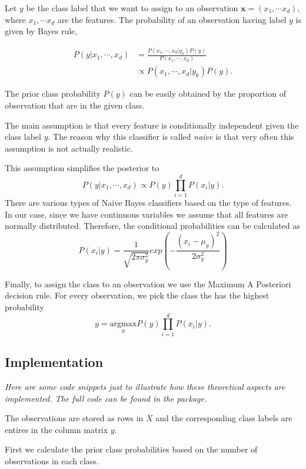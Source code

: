 \documentclass[]{article}
\begin{document}
Let \(y\) be the class label that we want to assign to an observation
\(\boldsymbol{x}=(x_1,\cdots x_d)\), where \(x_1,\cdots x_d\) are the
features. The probability of an observation having label \(y\) is given
by Bayes rule,

\begin{align*}
P(y|x_1,\cdots,x_d)&=\frac{P(x_1,\cdots,x_d|y_k)P(y)}{P(x_1,\cdots,x_d)}\\
&\propto P(x_1,\cdots,x_d|y_k)P(y).
\end{align*}

The prior class probability \(P(y)\) can be easily obtained by the
proportion of observation that are in the given class.

The main assumption is that every feature is conditionally independent
given the class label \(y\). The reason why this classifier is called
\emph{naive} is that very often this assumption is not actually
realistic.

This assumption simplifies the posterior to
\[P(y|x_1,\cdots,x_d) \propto P(y)\prod_{i=1}^d P(x_i|y).\] There are
various types of Naive Bayes classifiers based on the type of features.
In our case, since we have continuous variables we assume that all
features are normally distributed. Therefore, the conditional
probabilities can be calculated as
\[P(x_i|y)=\frac{1}{\sqrt{2\pi\sigma_y^2}}exp\left(-\frac{(x_i-\mu_y)^2}{2\sigma_y^2}\right)\]

Finally, to assign the class to an observation we use the Maximum A
Posteriori decision rule. For every observation, we pick the class the
has the highest probability
\[y=\underset{y}{\text{argmax}}P(y)\prod_{i=1}^dP(x_i|y).\]

\subsection{Implementation}\label{implementation}

\emph{Here are some code snippets just to illustrate how these
theoretical aspects are implemented. The full code can be found in the
package.}

The observations are stored as rows in \(X\) and the corresponding class
labels are entires in the column matrix \(y\).

First we calculate the prior class probabilities based on the number of
observations in each class.
\end{document}
